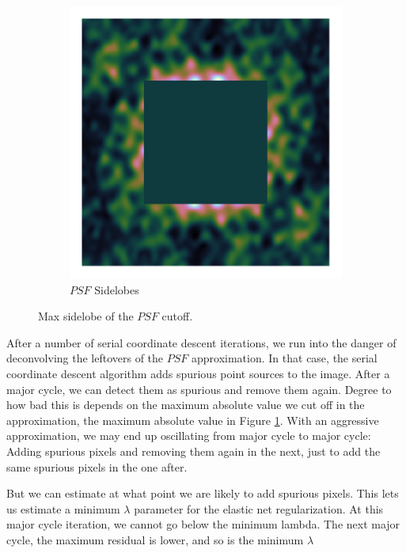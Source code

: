 \begin{figure}[h]
\begin{subfigure}[b]{0.3\linewidth}
		\includegraphics[width=\linewidth, clip, trim= 0.25in 0.25in 0.25in 0.25in]{./chapters/03.cd/simulated/psfReverseCut.png}
		\caption{$PSF$ Sidelobes}
		\label{gradient:convergence:reverseCut}
	\end{subfigure}
	
	\caption{Max sidelobe of the $PSF$ cutoff.}
	\label{gradient:convergence:sidelobe}
\end{figure}

After a number of serial coordinate descent iterations, we run into the danger of deconvolving the leftovers of the $PSF$ approximation. In that case, the serial coordinate descent algorithm adds spurious point sources to the image. After a major cycle, we can detect them as spurious and remove them again.
Degree to how bad this is depends on the maximum absolute value we cut off in the approximation, the maximum absolute value in Figure \ref{gradient:convergence:reverseCut}. With an aggressive approximation, we may end up oscillating from major cycle to major cycle: Adding spurious pixels and removing them again in the next, just to add the same spurious pixels in the one after.

But we can estimate at what point we are likely to add spurious pixels. This lets us estimate a minimum $\lambda$ parameter for the elastic net regularization. At this major cycle iteration, we cannot go below the minimum lambda. The next major cycle, the maximum residual is lower, and so is the minimum $\lambda$

